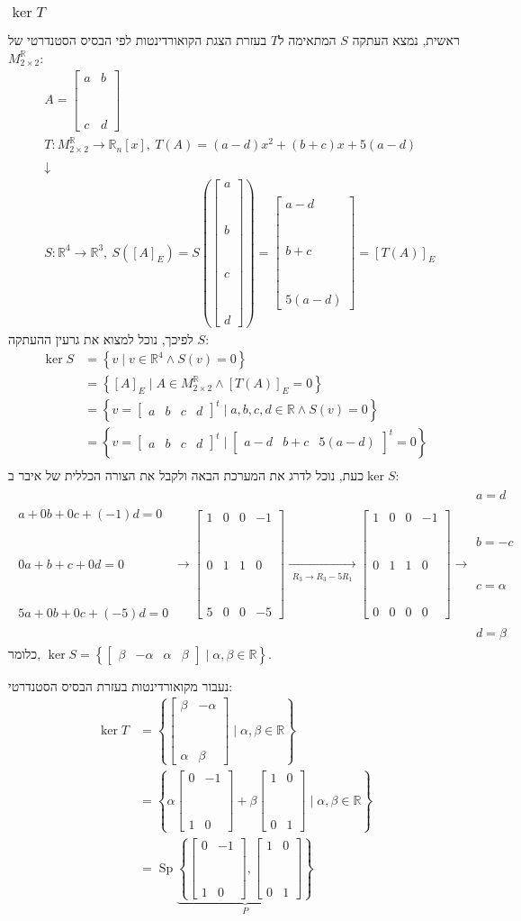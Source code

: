 \documentclass[11pt, oneside]{article}
\newcommand{\br}{\\\\\\\\\\\\\\}
\newcommand{\opr}[1]{\xrightarrow[\text{#1}]{}}
\newcommand{\oprm}[1]{\underset{\substack{#1}}{\longrightarrow}}
\newcommand{\mR}{\mathbb{R}}
\DeclareMathOperator{\Sp}{Sp}
\newcommand{\fiv}[4]{\begin{bmatrix}#1 \br #2 \br #3 \br #4\end{bmatrix}}
\newcommand{\fir}[4]{\begin{bmatrix}#1 & #2 & #3 & #4\end{bmatrix}}
\newcommand{\fim}[4]{\begin{bmatrix}#1 & #2 \br #3 & #4\end{bmatrix}}
\newcommand{\tiv}[3]{\begin{bmatrix}#1 \br #2 \br #3\end{bmatrix}}
\newcommand{\tir}[3]{\begin{bmatrix}#1 & #2 & #3\end{bmatrix}}
\begin{document}
\subsubsection{$\ker T$}
ראשית, נמצא העתקה $S$ המתאימה ל$T$ בעזרת הצגת הקואורדינטות לפי הבסיס הסטנדרטי של $M^\mR_{2 \times 2}$:
\begin{eqnarray*}
& A = \begin{bmatrix}
a & b\br
c & d
\end{bmatrix}\\
& T: M^\mR_{2 \times 2} \opr{} \mR_n[x],\ T(A) = (a - d)x^2 + (b + c)x + 5(a - d)\\
& \downarrow\\
& S: \mR^4 \opr{} \mR^3,\ S([A]_E) = S\left(\fiv{a}{b}{c}{d}\right) = \tiv{a - d}{b + c}{5(a - d)} = [T(A)]_E
\end{eqnarray*}
לפיכך, נוכל למצוא את גרעין ההעתקה $S$:
\begin{align*}
\ker S
& = \left\{v \mid v \in \mR^4 \land S(v) = 0\right\}\\
& = \left\{[A]_E \mid A \in M^\mR_{2 \times 2} \land [T(A)]_E = 0\right\}\\
& = \left\{v = \fir{a}{b}{c}{d}^t \mid a, b, c, d \in \mR \land S(v) = 0\right\}\\
& = \left\{v = \fir{a}{b}{c}{d}^t \mid \tir{a - d}{b + c}{5(a - d)}^t = 0\right\}\\
\end{align*}
כעת, נוכל לדרג את המערכת הבאה ולקבל את הצורה הכללית של איבר ב$\ker S$:
\begin{align*}
\begin{matrix}
a + 0b + 0c + (-1)d = 0\br
0a + b + c + 0d = 0\br
5a + 0b + 0c + (-5)d = 0
\end{matrix}
\opr{}
\begin{bmatrix}
1 & 0 & 0 & -1\br
0 & 1 & 1 & 0\br
5 & 0 & 0 & -5
\end{bmatrix}
\oprm{%
R_3 \opr{} R_3 - 5R_1
}
\begin{bmatrix}
1 & 0 & 0 & -1\br
0 & 1 & 1 & 0\br
0 & 0 & 0 & 0
\end{bmatrix}
\opr{}
\begin{matrix}
a = d\br
b = -c\br
c = \alpha\br
d = \beta
\end{matrix}
\end{align*}
כלומר, $\ker S = \left\{\fir{\beta}{-\alpha}{\alpha}{\beta} \mid \alpha, \beta \in \mR\right\}$.

נעבור מקואורדינטות בעזרת הבסיס הסטנדרטי:
\begin{align*}
\ker T
& = \left\{\fim{\beta}{-\alpha}{\alpha}{\beta} \mid \alpha, \beta \in \mR\right\}\\
& = \left\{\alpha\fim{0}{-1}{1}{0} + \beta\fim{1}{0}{0}{1} \mid \alpha, \beta \in \mR \right\}\\
& = \Sp\underbrace{\left\{\fim{0}{-1}{1}{0}, \fim{1}{0}{0}{1}\right\}}_P
\end{align*}
\end{document}
